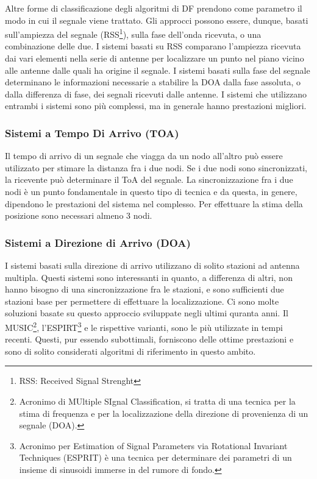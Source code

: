 Altre forme di classificazione degli algoritmi di DF prendono come parametro il modo in cui il segnale viene trattato. Gli approcci possono essere, dunque, basati sull'ampiezza del segnale (RSS\footnote{RSS: Received Signal Strenght}), sulla fase	dell'onda ricevuta, o una combinazione delle due. I sistemi basati su RSS comparano l'ampiezza ricevuta dai vari elementi nella serie di antenne per localizzare un punto nel piano vicino alle antenne dalle quali ha origine il segnale. I sistemi basati sulla fase del segnale determinano le informazioni necessarie a stabilire la DOA dalla fase assoluta, o dalla differenza di fase, dei segnali ricevuti dalle antenne. I sistemi che utilizzano entrambi i sistemi sono più complessi, ma in generale hanno prestazioni migliori.

\subsubsection{Sistemi a Tempo Di Arrivo (TOA)}

Il tempo di arrivo di un segnale che viagga da un nodo all'altro può essere utilizzato per stimare la distanza fra i due nodi. Se i due nodi sono sincronizzati, la ricevente può determinare il ToA del segnale. La sincronizzazione fra i due nodi è un punto fondamentale in questo tipo di tecnica e da questa, in genere, dipendono le prestazioni del sistema nel complesso. Per effettuare la stima della posizione sono necessari almeno 3 nodi.

\subsubsection{Sistemi a Direzione di Arrivo (DOA)}

I sistemi basati sulla direzione di arrivo utilizzano di solito stazioni ad antenna multipla. Questi sistemi sono interessanti in quanto, a differenza di altri, non hanno bisogno di una sincronizzazione fra le stazioni, e sono sufficienti due stazioni base per permettere	di effettuare la localizzazione. Ci sono molte soluzioni basate su questo approccio sviluppate negli ultimi quranta anni. Il MUSIC\footnote{Acronimo di MUltiple SIgnal Classification, si tratta di una tecnica per la stima di frequenza e per la localizzazione della direzione di provenienza di un segnale (DOA).}, l'ESPIRT\footnote{Acronimo per Estimation of Signal Parameters via Rotational Invariant Techniques (ESPRIT) è una tecnica per determinare dei parametri di un insieme di sinusoidi immerse in del rumore di fondo.} e le rispettive varianti, sono le più utilizzate in tempi recenti. Questi, pur essendo subottimali, forniscono delle ottime prestazioni e sono di solito considerati algoritmi di riferimento in questo ambito.

